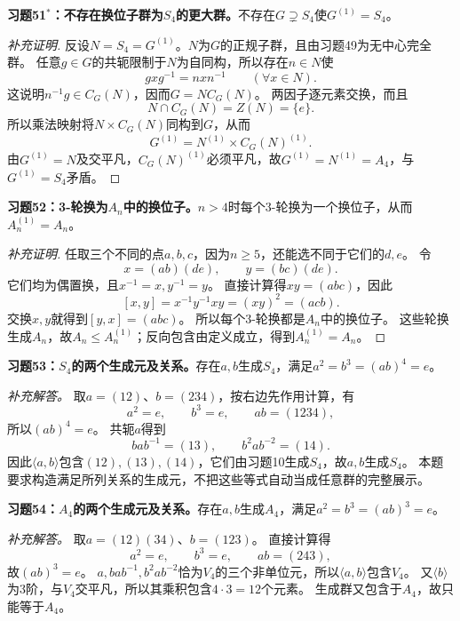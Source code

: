 \begin{problem}
\textbf{习题51$^*$：不存在换位子群为$S_4$的更大群。}不存在$G\supsetneq S_4$使$G^{(1)}=S_4$。
\end{problem}
\begin{proof}[补充证明]
反设$N=S_4=G^{(1)}$。$N$为$G$的正规子群，且由习题49为无中心完全群。
任意$g\in G$的共轭限制于$N$为自同构，所以存在$n\in N$使
\[
gxg^{-1}=nxn^{-1}\qquad(\forall x\in N).
\]
这说明$n^{-1}g\in C_G(N)$，因而$G=N C_G(N)$。
两因子逐元素交换，而且
\[
N\cap C_G(N)=Z(N)=\{e\}.
\]
所以乘法映射将$N\times C_G(N)$同构到$G$，从而
\[
G^{(1)}=N^{(1)}\times C_G(N)^{(1)}.
\]
由$G^{(1)}=N$及交平凡，$C_G(N)^{(1)}$必须平凡，故$G^{(1)}=N^{(1)}=A_4$，与$G^{(1)}=S_4$矛盾。
\end{proof}

\begin{problem}
\textbf{习题52：3-轮换为$A_n$中的换位子。}$n>4$时每个3-轮换为一个换位子，从而$A_n^{(1)}=A_n$。
\end{problem}
\begin{proof}[补充证明]
任取三个不同的点$a,b,c$，因为$n\geq5$，还能选不同于它们的$d,e$。
令
\[
x=(ab)(de),\qquad y=(bc)(de).
\]
它们均为偶置换，且$x^{-1}=x,y^{-1}=y$。
直接计算得$xy=(abc)$，因此
\[
[x,y]=x^{-1}y^{-1}xy=(xy)^2=(acb).
\]
交换$x,y$就得到$[y,x]=(abc)$。
所以每个3-轮换都是$A_n$中的换位子。
这些轮换生成$A_n$，故$A_n\leq A_n^{(1)}$；反向包含由定义成立，得到$A_n^{(1)}=A_n$。
\end{proof}

\begin{problem}
\textbf{习题53：$S_4$的两个生成元及关系。}存在$a,b$生成$S_4$，满足$a^2=b^3=(ab)^4=e$。
\end{problem}
\begin{solution}
\textit{补充解答。}
取$a=(12)$、$b=(234)$，按右边先作用计算，有
\[
a^2=e,\qquad b^3=e,\qquad ab=(1234),
\]
所以$(ab)^4=e$。
共轭$a$得到
\[
bab^{-1}=(13),\qquad b^2ab^{-2}=(14).
\]
因此$\langle a,b\rangle$包含$(12),(13),(14)$，它们由习题10生成$S_4$，故$a,b$生成$S_4$。
本题要求构造满足所列关系的生成元，不把这些等式自动当成任意群的完整展示。
\end{solution}

\begin{problem}
\textbf{习题54：$A_4$的两个生成元及关系。}存在$a,b$生成$A_4$，满足$a^2=b^3=(ab)^3=e$。
\end{problem}
\begin{solution}
\textit{补充解答。}
取$a=(12)(34)$、$b=(123)$。
直接计算得
\[
a^2=e,\qquad b^3=e,\qquad ab=(243),
\]
故$(ab)^3=e$。
$a,bab^{-1},b^2ab^{-2}$恰为$V_4$的三个非单位元，所以$\langle a,b\rangle$包含$V_4$。
又$\langle b\rangle$为3阶，与$V_4$交平凡，所以其乘积包含$4\cdot3=12$个元素。
生成群又包含于$A_4$，故只能等于$A_4$。
\end{solution}

